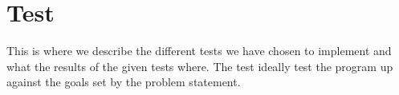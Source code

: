 \chapter{Test}

This is where we describe the different tests we have chosen to implement and what the results of the given tests where. The test ideally test the program up against the goals set by the problem statement.
